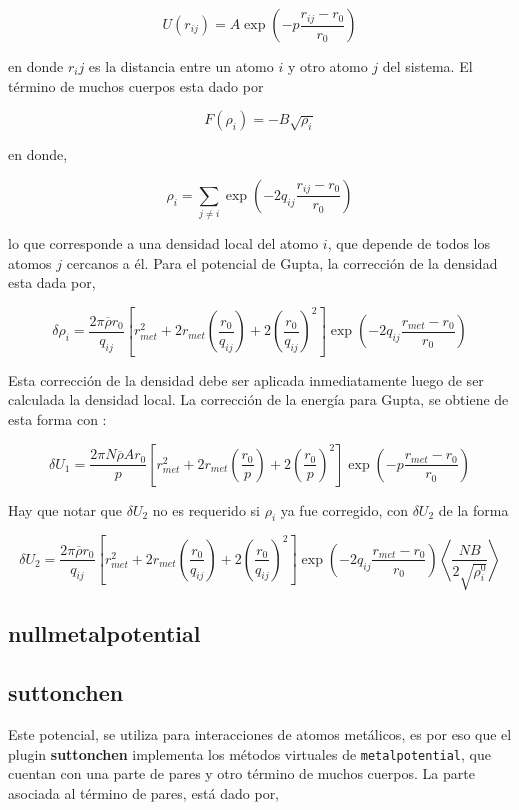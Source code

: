 $$U(r_{ij}) = A\exp{\left(-p\frac{r_{ij}-r_0}{r_0}\right)}$$

en donde $r_ij$ es la distancia entre un atomo $i$ y otro atomo $j$ del sistema. El t\'ermino de muchos cuerpos esta dado por

$$F(\rho_{i}) = -B\sqrt{\rho_i}$$

en donde,

$$\rho_i = \sum_{j\neq i} \exp{\left(-2q_{ij}\frac{r_{ij}-r_0}{r_0}\right)}$$

lo que corresponde a una densidad local del atomo $i$, que depende de todos los atomos $j$ cercanos a \'el. Para el potencial de Gupta, la correcci\'on de la densidad esta dada por,

$$\delta\rho_i=\frac{2\pi\overline{\rho}r_0}{q_{ij}}\left[r^2_{met}+2r_{met}\left(\frac{r_0}{q_{ij}}\right)+2\left(\frac{r_0}{q_{ij}}\right)^2\right]\exp{\left(-2q_{ij}\frac{r_{met}-r_0}{r_0}\right)}$$

Esta correcci\'on de la densidad debe ser aplicada inmediatamente luego de ser calculada la densidad local. La correcci\'on de la energ\'ia para Gupta, se obtiene de esta forma con :

$$\delta U_1 = \frac{2\pi N\overline{\rho}A r_0}{p}\left[r^2_{met}+2r_{met}\left(\frac{r_0}{p}\right)+2\left(\frac{r_0}{p}\right)^2\right]\exp{\left(-p\frac{r_{met}-r_0}{r_0}\right)}$$

Hay que notar que $\delta U_2$ no es requerido si $\rho_i$ ya fue corregido, con $\delta U_2$ de la forma

$$\delta U_2 = \frac{2\pi\overline{\rho} r_0}{q_{ij}}\left[r^2_{met}+2r_{met}\left(\frac{r_0}{q_{ij}}\right)+2\left(\frac{r_0}{q_{ij}}\right)^2\right]\exp{\left(-2q_{ij}\frac{r_{met}-r_0}{r_0}\right)}\left<\frac{NB}{2\sqrt{\rho_i^0}}\right>$$

\subsection{nullmetalpotential}

\subsection{suttonchen}
Este potencial, se utiliza para interacciones de atomos met\'alicos, es por eso que el plugin \textbf{suttonchen} implementa los m\'etodos virtuales de \verb|metalpotential|, que cuentan con una parte de pares y otro t\'ermino de muchos cuerpos. La parte asociada al t\'ermino de pares, est\'a dado por,

